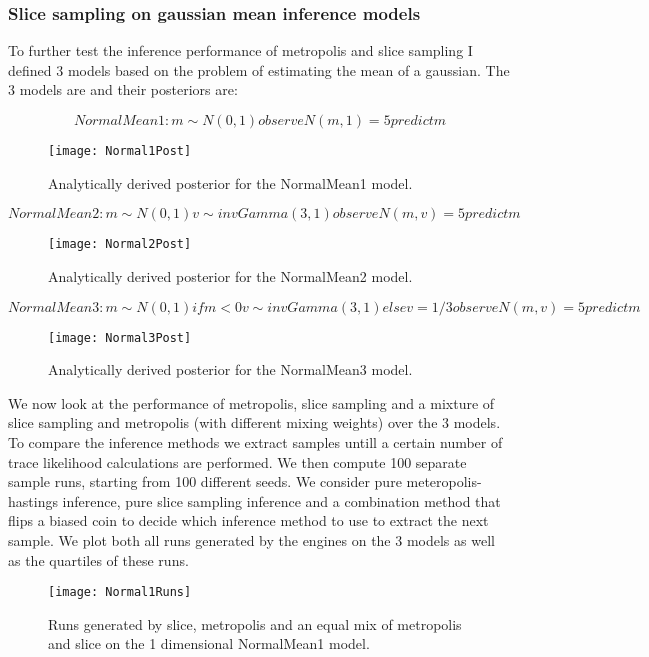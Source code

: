 \subsubsection{Slice sampling on gaussian mean inference models}
To further test the inference performance of metropolis and slice sampling I defined 3 models based on the problem of estimating the mean of a gaussian. The 3 models are and their posteriors are:

$$
NormalMean1:
m \sim N(0,1)
observe N(m,1) = 5
predict m
$$

\begin{figure}[H]
    \centering
    \texttt{[image: Normal1Post]}
    \caption{Analytically derived posterior for the NormalMean1 model.}
    \label{fig:Normal1Post}
\end{figure}

$$
NormalMean2:
m \sim N(0,1)
v \sim invGamma(3,1)
observe N(m,v) = 5
predict m
$$

\begin{figure}[H]
    \centering
    \texttt{[image: Normal2Post]}
    \caption{Analytically derived posterior for the NormalMean2 model.}
    \label{fig:Normal2Post}
\end{figure}

$$
NormalMean3:
m \sim N(0,1)
if m < 0
    v \sim invGamma(3,1)
else
    v = 1/3
observe N(m,v) = 5
predict m
$$

\begin{figure}[H]
    \centering
    \texttt{[image: Normal3Post]}
    \caption{Analytically derived posterior for the NormalMean3 model.}
    \label{fig:Normal3Post}
\end{figure}

We now look at the performance of metropolis, slice sampling and a mixture of slice sampling and metropolis (with different mixing weights) over the 3 models. To compare the inference methods we extract samples untill a certain number of trace likelihood calculations are performed. We then compute 100 separate sample runs, starting from 100 different seeds. We consider pure meteropolis-hastings inference, pure slice sampling inference and a combination method that flips a biased coin to decide which inference method to use to extract the next sample.
We plot both all runs generated by the engines on the 3 models as well as the quartiles of these runs.

\begin{figure}[H]
    \centering
    \texttt{[image: Normal1Runs]}
    \caption{Runs generated by slice, metropolis and an equal mix of metropolis and slice on the 1 dimensional NormalMean1 model.}
    \label{fig:Normal1Runs}
\end{figure}

